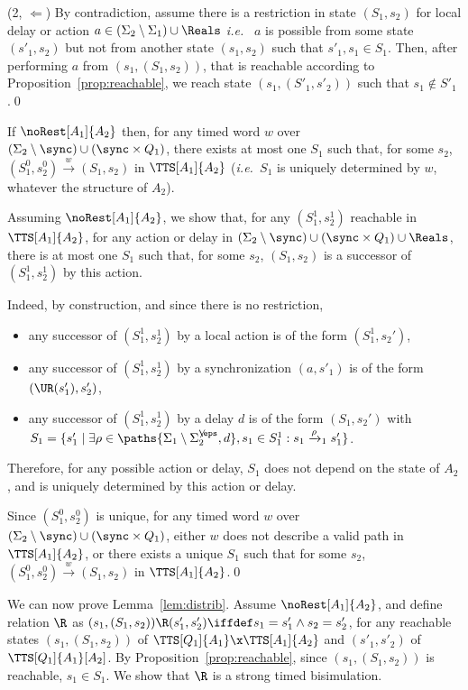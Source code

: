 \documentclass{LMCS}
\theoremstyle{plain}\newtheorem*{prop11}{Proposition~\ref{prop:states} bis}
\def\ie{{\em i.e.\ }}
\begin{document}
  (2, $\Leftarrow$) By contradiction, assume there is a restriction in state $(S_1,s_2)$ for
  local delay or action $a\in(\Sigma_2\setminus\Sigma_1)\cup\Reals$ \ie
  $a$ is possible from some state $(s'_1, s_2)$ but not from another state
  $(s_1,s_2)$ such that $s'_1,s_1\in S_1$. Then, after performing $a$ from
  $(s_1,(S_1,s_2))$, that is reachable according to
  Proposition~\ref{prop:reachable}, we reach state $(s_1,(S'_1,s'_2))$ such
  that $s_1\notin S'_1$.\qed

\begin{prop}\label{prop:uniqueness}
  If $\noRest[A_1]{A_2}$ then,
  for any timed word $w$ over $(\Sigma_2\setminus\sync)\cup
  (\sync\times Q_1)$, there exists at most one $S_1$ such that, for some $s_2$,
  $(S_1^0,s_2^0)\xrightarrow{w}(S_1,s_2)$ in $\TTS[A_1]{A_2}$
  (\ie $S_1$ is uniquely determined by $w$, whatever the structure of
  $A_2$).
\end{prop}
\proof Assuming $\noRest[A_1]{A_2}$, we show that, for any $(S_1^1,s_2^1)$ reachable
in $\TTS[A_1]{A_2}$, for any action or delay in
$(\Sigma_2\setminus\sync)\cup(\sync\times Q_1)\cup\Reals$,
there is at most one $S_1$ such that, for some $s_2$, $(S_1,s_2)$ is a
successor of $(S_1^1,s_2^1)$ by this action.

Indeed, by construction, and since there is no restriction,
\begin{itemize}
  \item any successor of $(S_1^1,s_2^1)$ by a local action is of the form
  $(S_1^1,s_2')$,
  \item any successor of $(S_1^1,s_2^1)$ by a synchronization $(a,s'_1)$ is
  of the form $(\UR(s'_1),s_2')$,
  \item any successor of $(S_1^1,s_2^1)$ by a delay $d$ is
  of the form $(S_1,s_2')$ with $S_1=\{s'_1\mid
  \exists \rho\in\paths{\Sigma_1\setminus\Sigma_{2}^{\not\eps},d},s_1\in S_1^1:
  s_1\xrightarrow{\rho}_1 s'_1\}$.
\end{itemize}
Therefore, for any possible action or delay, $S_1$ does not depend on the
state of $A_2$, and is uniquely determined by this action or delay.

Since $(S_1^0,s_2^0)$ is unique, for any timed word $w$ over
$(\Sigma_2\setminus\sync)\cup(\sync\times Q_1)$, either $w$ does not
describe a valid path in $\TTS[A_1]{A_2}$, or there exists a unique $S_1$
such that for some $s_2$,
$(S_1^0,s_2^0)\xrightarrow{w}(S_1,s_2)$ in $\TTS[A_1]{A_2}$.\qed

We can now prove Lemma~\ref{lem:distrib}.
  Assume $\noRest[A_1]{A_2}$, and define relation
  $\R$ as $(s_1,(S_1,s_2))\R (s'_1,s'_2)\iffdef s_1=s'_1 \land s_2=s'_2$,
  for any reachable states
  $(s_1,(S_1,s_2))$ of $\TTS[Q_1]{A_1}\x\TTS[A_1]{A_2}$ and
  $(s'_1,s'_2)$ of $\TTS[Q_1]{A_1}[A_2]$.
  By Proposition~\ref{prop:reachable}, since $(s_1,(S_1,s_2))$
  is reachable, $s_1\in S_1$.
We show that $\R$ is a strong timed bisimulation.
\end{document}
